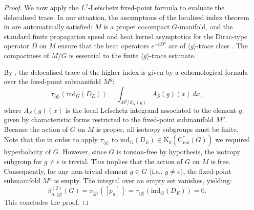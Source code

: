 \documentclass[a4paper,leqno,12pt]{article}
\numberwithin{equation}{section}
\theoremstyle{plain}
\theoremstyle{definition}
\theoremstyle{remark}
\newcommand{\Csr}{\mathrm{C}^*_{\text{red}}}
\begin{document}
\begin{proof}
We now apply the $L^2$-Lefschetz fixed-point formula to evaluate the delocalised trace. In our situation, the assumptions of the localised index theorem in \cite{WangWang16} are automatically satisfied: $M$ is a proper cocompact $G$-manifold, and the standard finite propagation speed and heat kernel asymptotics for the Dirac-type operator $D$ on $M$ ensure that the heat operators $e^{-tD^2}$ are of $\langle g \rangle$-trace class \cite[Section 3]{WangWang16}. The compactness of $M/G$ is essential to the finite $\langle g \rangle$-trace estimate. 

By \cite[Theorem 6.1]{WangWang16}, the delocalised trace of the higher index is given by a cohomological formula over the fixed-point submanifold $M^g$:
\begin{equation*}
\tau_{\langle g \rangle}(\mathrm{ind}_G(D_E)) = \int_{M^g / Z_G(g)} A_S(g)(x) \, dx,
\end{equation*}
where $A_S(g)(x)$ is the local Lefschetz integrand associated to the element $g$, given by characteristic forms restricted to the fixed-point submanifold $M^g$. 
Because the action of $G$ on $M$ is proper, all isotropy subgroups must be finite. 
Note that the in order to apply $\tau_{\langle g \rangle}$ to $\mathrm{ind}_G(D_E)\in \mathrm K_0(\Csr(G))$ we required hyperbolicity of $G$. 
However, since $G$ is torsion-free by hypothesis, the isotropy subgroup for $g\neq e$ is trivial. This implies that the action of $G$ on $M$ is free. 
Consequently, for any non-trivial element $g \in G$ (i.e., $g \neq e$), the fixed-point submanifold $M^g$ is empty. The integral over an empty set vanishes, yielding:
\begin{equation*}
\beta_{n,\langle g\rangle}^{(2)}(G) = \tau_{\langle g \rangle}([p_n]) = \tau_{\langle g \rangle}(\text{ind}_G(D_E)) = 0.
\end{equation*}
This concludes the proof.
\end{proof}
\end{document}
